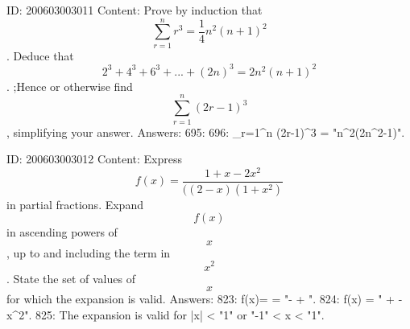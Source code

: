 \documentclass{article}
\begin{document}
ID: 200603003011
Content:
Prove by induction that $$ \sum_{r=1}^{n}r^{3}= \frac{1}{4} n^{2}(n+1)^{2}$$. Deduce that $$2^{3}+4^{3}+6^{3}+...+(2n)^{3}=2n^{2}(n+1)^{2}$$. ;Hence or otherwise find $$ \sum_{r=1}^{n} (2r-1)^3$$, simplifying your answer. Answers:
695: 
696:  \sum_{r=1}^{n} (2r-1)^3 = "n^2(2n^2-1)".

ID: 200603003012
Content:
Express $$f(x)= \frac{1+x-2x^{2}}{((2-x)(1+x^{2})} $$ in partial fractions. Expand $$f(x)$$ in ascending powers of $$x$$, up to and including the term in $$x^{2} $$. State the set of values of $$x$$ for which the expansion is valid.  Answers:
823: f(x)=   = "- + ".
824: f(x) = " +  - x^2".
825: The expansion is valid for |x| < "1" or "-1" < x < "1".
\end{document}
